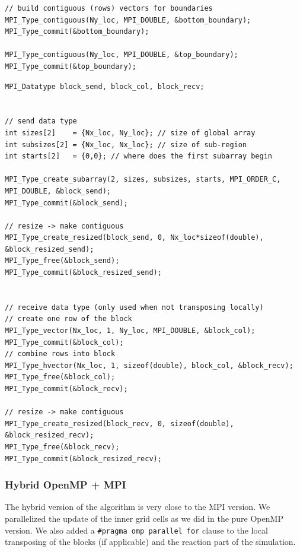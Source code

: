 \documentclass[a4paper]{article}
\begin{document}
\begin{lstlisting}[label={lst:datatypes-ghost}, caption={MPI data types for ghost cells}, float]
// build contiguous (rows) vectors for boundaries
MPI_Type_contiguous(Ny_loc, MPI_DOUBLE, &bottom_boundary);
MPI_Type_commit(&bottom_boundary);

MPI_Type_contiguous(Ny_loc, MPI_DOUBLE, &top_boundary);
MPI_Type_commit(&top_boundary);
\end{lstlisting}


\begin{lstlisting}[label={lst:datatypes-transpose}, caption={MPI data types for transposing the grid}, float]
MPI_Datatype block_send, block_col, block_recv;


// send data type
int sizes[2]    = {Nx_loc, Ny_loc}; // size of global array
int subsizes[2] = {Nx_loc, Nx_loc}; // size of sub-region
int starts[2]   = {0,0}; // where does the first subarray begin

MPI_Type_create_subarray(2, sizes, subsizes, starts, MPI_ORDER_C, MPI_DOUBLE, &block_send);
MPI_Type_commit(&block_send);

// resize -> make contiguous
MPI_Type_create_resized(block_send, 0, Nx_loc*sizeof(double), &block_resized_send);
MPI_Type_free(&block_send);
MPI_Type_commit(&block_resized_send);


// receive data type (only used when not transposing locally)
// create one row of the block
MPI_Type_vector(Nx_loc, 1, Ny_loc, MPI_DOUBLE, &block_col);
MPI_Type_commit(&block_col);
// combine rows into block
MPI_Type_hvector(Nx_loc, 1, sizeof(double), block_col, &block_recv);
MPI_Type_free(&block_col);
MPI_Type_commit(&block_recv);

// resize -> make contiguous
MPI_Type_create_resized(block_recv, 0, sizeof(double), &block_resized_recv);
MPI_Type_free(&block_recv);
MPI_Type_commit(&block_resized_recv);
\end{lstlisting}



\subsubsection{Hybrid OpenMP + MPI}
The hybrid version of the algorithm is very close to the MPI version.
We parallelized the update of the inner grid cells as we did in the pure OpenMP version.
We also added a \verb+#pragma omp parallel for+ clause to the local transposing of the blocks (if applicable) and the reaction part of the simulation.
\end{document}
